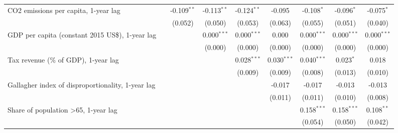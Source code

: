 \begin{table}[htbp]
\begin{tabular}{lcccccccc}
      CO2 emissions per capita, 1-year lag                                                            &                & -0.109$^{**}$ & -0.113$^{**}$ & -0.124$^{**}$ & -0.095        & -0.108$^{*}$  & -0.096$^{*}$  & -0.075$^{*}$\\   
                                                                                                      &                & (0.052)       & (0.050)       & (0.053)       & (0.063)       & (0.055)       & (0.051)       & (0.040)\\   
      GDP per capita (constant 2015 US\$), 1-year lag                                                 &                &               & 0.000$^{***}$ & 0.000$^{***}$ & 0.000         & 0.000$^{***}$ & 0.000$^{***}$ & 0.000$^{***}$\\   
                                                                                                      &                &               & (0.000)       & (0.000)       & (0.000)       & (0.000)       & (0.000)       & (0.000)\\   
      Tax revenue (\% of GDP), 1-year lag                                                             &                &               &               & 0.028$^{***}$ & 0.030$^{***}$ & 0.040$^{***}$ & 0.023$^{*}$   & 0.018\\   
                                                                                                      &                &               &               & (0.009)       & (0.009)       & (0.008)       & (0.013)       & (0.010)\\   
      Gallagher index of disproportionality, 1-year lag                                               &                &               &               &               & -0.017        & -0.017        & -0.013        & -0.013\\   
                                                                                                      &                &               &               &               & (0.011)       & (0.011)       & (0.010)       & (0.008)\\   
      Share of population >65, 1-year lag                                                             &                &               &               &               &               & 0.158$^{***}$ & 0.158$^{***}$ & 0.108$^{**}$\\   
                                                                                                      &                &               &               &               &               & (0.054)       & (0.050)       & (0.042)\\   

\end{tabular}
\end{table}
